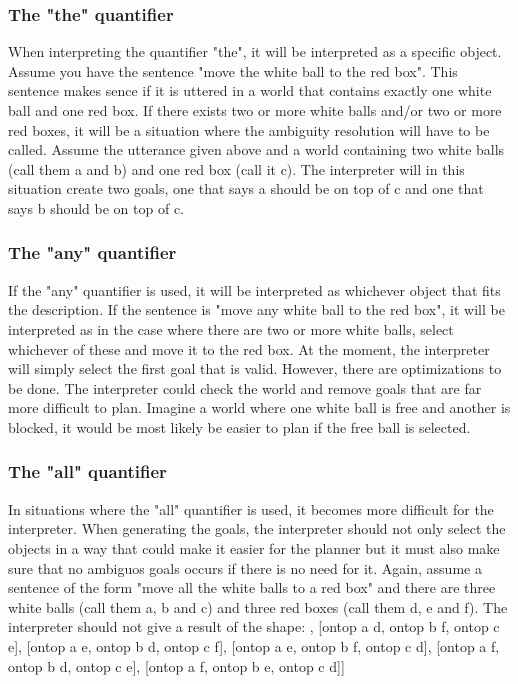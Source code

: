\documentclass[11pt]{article}
\begin{document}
\subsubsection*{The "the" quantifier}
When interpreting the quantifier "the", it will be interpreted as a specific object. Assume you have the sentence "move the white ball to the red box". This sentence makes sence if it is uttered in a world that contains exactly one white ball and one red box. If there exists two or more white balls and/or two or more red boxes, it will be a situation where the ambiguity resolution will have to be called. Assume the utterance given above and a world containing two white balls (call them a and b) and one red box (call it c). The interpreter will in this situation create two goals, one that says a should be on top of c and one that says b should be on top of c.

\subsubsection*{The "any" quantifier}
If the "any" quantifier is used, it will be interpreted as whichever object that fits the description. If the sentence is "move any white ball to the red box", it will be interpreted as in the case where there are two or more white balls, select whichever of these and move it to the red box. At the moment, the interpreter will simply select the first goal that is valid. However, there are optimizations to be done. The interpreter could check the world and remove goals that are far more difficult to plan. Imagine a world where one white ball is free and another is blocked, it would be most likely be easier to plan if the free ball is selected.

\subsubsection*{The "all" quantifier}
In situations where the "all" quantifier is used, it becomes more difficult for the interpreter. When generating the goals, the interpreter should not only select the objects in a way that could make it easier for the planner but it must also make sure that no ambiguos goals occurs if there is no need for it. Again, assume a sentence of the form "move all the white balls to a red box" and there are three white balls (call them a, b and c) and three red boxes (call them d, e and f). The interpreter should not give a result of the shape:
\newline
[[ontop a d, ontop b e, ontop c f], [ontop a d, ontop b f, ontop c e], [ontop a e, ontop b d, ontop c f], [ontop a e, ontop b f, ontop c d], [ontop a f, ontop b d, ontop c e], [ontop a f, ontop b e, ontop c d]]
\end{document}
